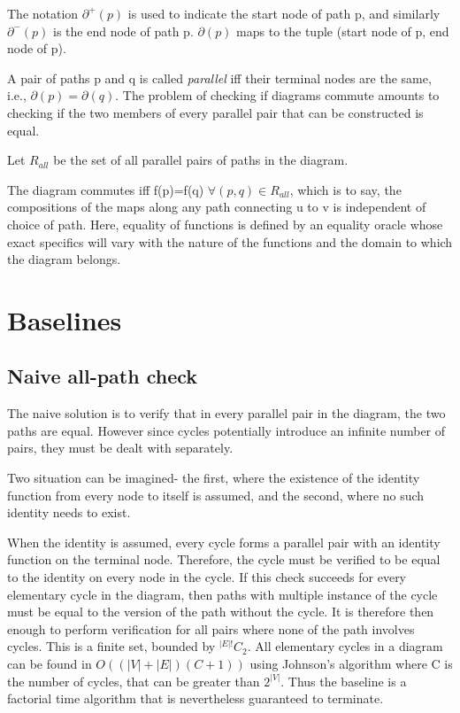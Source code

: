 \documentclass[runningheads]{llncs}
\begin{document}
The notation $\partial^{+}(p)$ is used to indicate the start node of path p, and similarly $\partial^-(p)$ is the end node of path p. $\partial(p)$ maps to the tuple (start node of p, end node of p).

A pair of paths p and q is called \textit{parallel} iff their terminal nodes are the same, i.e., $\partial(p)=\partial(q)$.
The problem of checking if diagrams commute amounts to checking if the two members of every parallel pair that can be constructed is equal.

Let $R_{all}$ be the set of all parallel pairs of paths in the diagram.

The diagram commutes iff f(p)=f(q) $\forall (p,q)\in R_{all}$, which is to say, the compositions of the maps along any path connecting u to v is independent of choice of path. Here, equality of functions is defined by an equality oracle whose exact specifics will vary with the nature of the functions and the domain to which the diagram belongs.

\section{Baselines}

\subsection{Naive all-path check}
The naive solution is to verify that in every parallel pair in the diagram, the two paths are equal. However since cycles potentially introduce an infinite number of pairs, they must be dealt with separately.

Two situation can be imagined- the first, where the existence of the identity function from every node to itself is assumed, and the second, where no such identity needs to exist.

When the identity is assumed, every cycle forms a parallel pair with an identity function on the terminal node. Therefore, the cycle must be verified to be equal to the identity on every node in the cycle. If this check succeeds for every elementary cycle in the diagram, then paths with multiple instance of the cycle must be equal to the version of the path without the cycle. It is therefore then enough to perform verification for all pairs where none of the path involves cycles. This is a finite set, bounded by $^{|E|!}C_2$. All elementary cycles in a diagram can be found in $O((|V|+|E|)(C+1))$ using Johnson's algorithm where C is the number of cycles, that can be greater than $2^{|V|}$. Thus the baseline is a factorial time algorithm that is nevertheless guaranteed to terminate.
\end{document}
